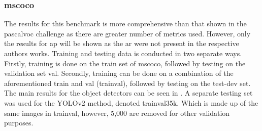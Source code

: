 \subsubsection{\gls{mscoco}}
The results for this benchmark is more comprehensive than that shown in the \gls{pascalvoc} challenge as there are greater number of metrics used. However, only the results for \gls{ap} will be shown as the \gls{ar} were not present in the respective authors works. Training and testing data is conducted in two separate ways. Firstly, training is done on the train set of \gls{mscoco}, followed by testing on the validation set val. Secondly, training can be done on a combination of the aforementioned train and val (trainval), followed by testing on the test-dev set. The main results for the object detectors can be seen in . A separate testing set was used for the YOLOv2 method, denoted trainval35k. Which is made up of the same images in trainval, however, 5,000 are removed for other validation purposes.

